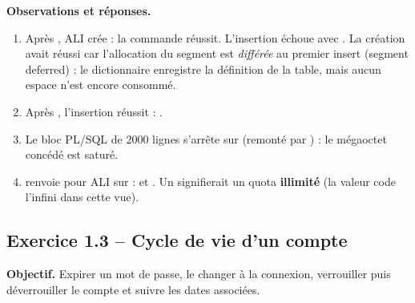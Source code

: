 \textbf{Observations et réponses.}
\begin{enumerate}
  \item Après , ALI crée  :
        la commande réussit. L'insertion échoue avec . La création avait réussi car l'allocation du segment est \emph{différée} au
        premier insert (segment deferred) : le dictionnaire enregistre la définition de la table, mais aucun
        espace n'est encore consommé.
  \item Après , l'insertion réussit : .
  \item Le bloc PL/SQL de 2000 lignes s'arrête sur  (remonté par ) : le mégaoctet concédé est saturé.
  \item {} renvoie pour ALI sur  :  et
        . Un  signifierait un quota \textbf{illimité}
        (la valeur  code l'infini dans cette vue).
\end{enumerate}

\subsection{Exercice 1.3 -- Cycle de vie d'un compte}
\textbf{Objectif.} Expirer un mot de passe, le changer à la connexion, verrouiller puis déverrouiller le
compte et suivre les dates associées.


